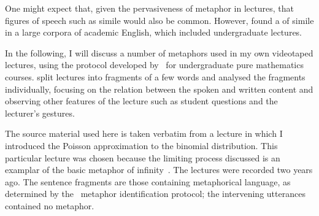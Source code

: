 One might expect that, given the pervasiveness of metaphor in
lectures, that figures of speech such as simile would also be common.
However,  found a 
of simile in a large corpora of academic English, which included
undergraduate lectures.

In the following, I will discuss a number of metaphors used in my own
videotaped lectures, using the protocol developed
by~ for undergraduate pure mathematics courses.
\citeauthor{bergsten2007} split lectures into fragments of a few words
and analysed the fragments individually, focusing on the relation
between the spoken and written content and observing other features of
the lecture such as student questions and the lecturer's gestures.

The source material used here is taken verbatim from a lecture in
which I introduced the Poisson approximation to the binomial
distribution.  This particular lecture was chosen because the limiting
process discussed is an examplar of the basic metaphor of
infinity~\parencite{lakoff2000}.  The lectures were recorded two years
ago.  The sentence fragments are those containing metaphorical
language, as determined by the~\citeauthor{pragglejaz2007} metaphor
identification protocol; the intervening utterances contained no
metaphor.


